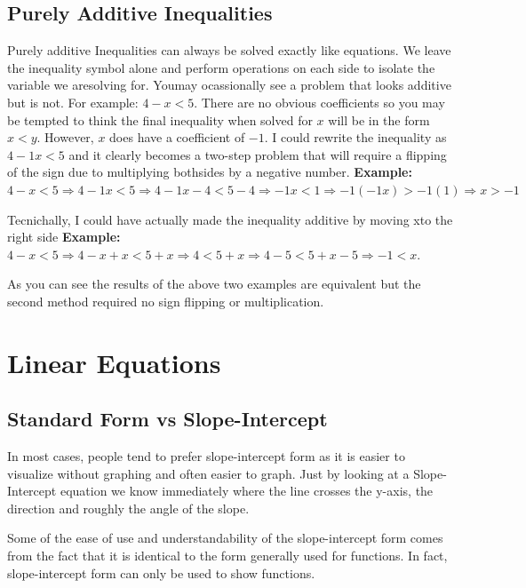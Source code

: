 \documentclass{article}
\begin{document}
\subsection{Purely Additive Inequalities}
Purely additive Inequalities can always be solved exactly like equations. We leave the inequality symbol alone and perform operations on each side to isolate the variable we aresolving for. Youmay ocassionally see a problem that looks additive but is not. For example:  $4-x<5$. There are no obvious coefficients so you may be tempted to think the final inequality when solved for $x$ will be in the form $x<y$. However, $x$ does have a coefficient of $-1$. I could rewrite the inequality as $4-1x<5$ and it clearly becomes a two-step problem that will require a flipping of the sign due to multiplying bothsides by a negative number.
\bigskip
\textbf{Example:} $4-x<5 \Rightarrow 4-1x<5 \Rightarrow 4-1x-4<5-4 \Rightarrow -1x<1 \Rightarrow -1(-1x)>-1(1) \Rightarrow x>-1$

\bigskip

Tecnichally, I could have actually made the inequality additive by moving xto the right side
\bigskip
\textbf{Example:} $4-x<5 \Rightarrow 4-x+x<5+x \Rightarrow 4<5+x \Rightarrow 4-5<5+x-5 \Rightarrow -1<x$.

\bigskip 

As you can see the results of the above two examples are equivalent but the second method required no sign flipping or multiplication.

\section{Linear Equations}
\subsection{Standard Form vs Slope-Intercept}

In most cases, people tend to prefer slope-intercept form as it is easier to visualize without graphing and often easier to graph. Just by looking at a Slope-Intercept equation we know immediately where the line crosses the y-axis, the direction and roughly the angle of the slope. 

\bigskip

Some of the ease of use and understandability of the slope-intercept form comes from the fact that it is identical to the form generally used for functions. In fact, slope-intercept form can only be used to show functions.
\end{document}

